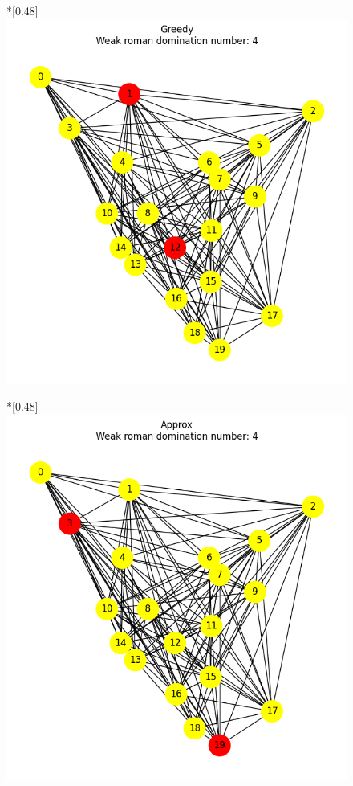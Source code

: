 \begin{figure}[htbp]
\begin{subcaptionbox}
        \end{subcaptionbox}
        \hfill
        \begin{subcaptionbox}*{}[0.48\linewidth]
            {\includegraphics[width=0.75\linewidth]{assets/plots/Greedy/ErdosRenyi_dense_n20_i2_results.png}}
        \end{subcaptionbox}
        \hfill
        \begin{subcaptionbox}*{}[0.48\linewidth]
            {\includegraphics[width=0.75\linewidth]{assets/plots/Approx/ErdosRenyi_dense_n20_i2_results.png}}
        \end{subcaptionbox}

\end{figure}
